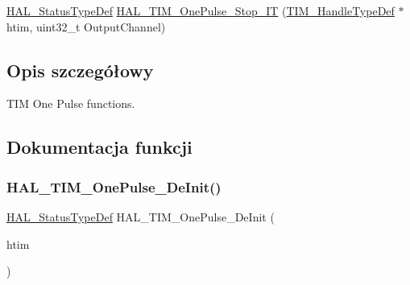 \begin{DoxyCompactItemize}
\item 
\hyperlink{stm32f4xx__hal__def_8h_a63c0679d1cb8b8c684fbb0632743478f}{H\+A\+L\+\_\+\+Status\+Type\+Def} \hyperlink{group___t_i_m___exported___functions___group5_ga6bbce5414404228fde71dadd8d1cddc7}{H\+A\+L\+\_\+\+T\+I\+M\+\_\+\+One\+Pulse\+\_\+\+Stop\+\_\+\+IT} (\hyperlink{struct_t_i_m___handle_type_def}{T\+I\+M\+\_\+\+Handle\+Type\+Def} $\ast$htim, uint32\+\_\+t Output\+Channel)
\end{DoxyCompactItemize}


\subsection{Opis szczegółowy}
T\+IM One Pulse functions. 



\subsection{Dokumentacja funkcji}
\mbox{\label{group___t_i_m___exported___functions___group5_gae60b468b11199522c6c83a943439c7b7}} 
\subsubsection{\texorpdfstring{H\+A\+L\+\_\+\+T\+I\+M\+\_\+\+One\+Pulse\+\_\+\+De\+Init()}{HAL\_TIM\_OnePulse\_DeInit()}}
{\footnotesize\ttfamily \hyperlink{stm32f4xx__hal__def_8h_a63c0679d1cb8b8c684fbb0632743478f}{H\+A\+L\+\_\+\+Status\+Type\+Def} H\+A\+L\+\_\+\+T\+I\+M\+\_\+\+One\+Pulse\+\_\+\+De\+Init (\begin{DoxyParamCaption}\item[{\hyperlink{struct_t_i_m___handle_type_def}{T\+I\+M\+\_\+\+Handle\+Type\+Def} $\ast$}]{htim }\end{DoxyParamCaption})}

\mbox{\label{group___t_i_m___exported___functions___group5_ga476d67a220c23ebdc69fac7b09dbaa72}} 
